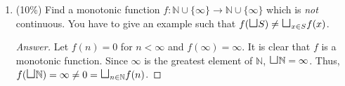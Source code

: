 \documentclass{article}
\begin{document}
\begin{enumerate}
\begin{proof}
          However, $\mathtt{Y}x.\,x$ is not a value, so we reach a contradiction. 
        \end{proof}
        \begin{proof}
          Alternatively, we do induction on the derivation of $\mathtt{Y}x.\,x
          \Downarrow \mathsf{V}$, and the only case is ($\Downarrow$-fix), i.e. 
          to have $\mathtt{Y}x.\, x\Downarrow \mathsf{V}$ we must have
          ${x[\mathtt{Y}x.\, x/x] \Downarrow \mathsf{V}}$ as a premise
          satisfying the induction hypothesis. That is, there is no term
          $\mathsf{V}$ satisfying $\mathtt{Y} x.\,x \Downarrow \mathsf{V}$. 
        \end{proof}
  \item (10\%) Find a monotonic function
    $f : \mathbb{N} \cup \{\infty\}  \to \mathbb{N} \cup \{\infty\}$
    which is \emph{not} continuous. You have to give an example
    such that $f({\mbox{\Large $\sqcup$}} S) \neq
    {\mbox{\Large $\sqcup$}}_{x \in S} f(x)$.
        \begin{proof}[Answer]
          Let $f(n) = 0$ for $n < \infty$ and $f(\infty) = \infty$. 
          It is clear that $f$ is a monotonic function. 
          Since $\infty$ is the greatest element of $\mathbb{N}$,
          $\mbox{\Large $\sqcup$} \mathbb{N} = \infty$.
          Thus, $f(\mbox{\Large $\sqcup$} \mathbb{N}) = \infty
          \neq 0 = \mbox{\Large $\sqcup$}_{n \in \mathbb{N}} f(n)$.
        \end{proof}
\end{enumerate}
\end{document}
